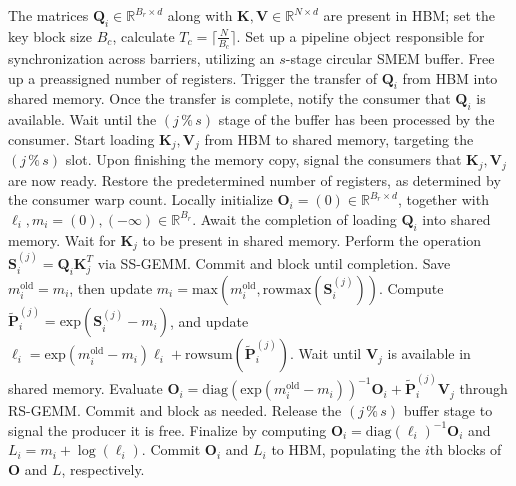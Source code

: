 \begin{algorithm}[H]
    \caption{\small\label{alg:flash3_wgmma_ws_only}\textsc{FlashAttention-3} forward pass \textbf{excluding} intra-consumer overlapping -- CTA perspective}
    \begin{algorithmic}[1]
\REQUIRE The matrices $\mathbf{Q}_i \in \mathbb{R}^{B_r \times d}$ along with $\mathbf{K}, \mathbf{V} \in \mathbb{R}^{N \times d}$ are present in HBM; set the key block size $B_c$, calculate $T_c = \lceil \frac{N}{B_c} \rceil$.
\STATE Set up a pipeline object responsible for synchronization across barriers, utilizing an $s$-stage circular SMEM buffer.
\STATE Free up a preassigned number of registers.
\STATE Trigger the transfer of $\mathbf{Q}_i$ from HBM into shared memory.
\STATE Once the transfer is complete, notify the consumer that $\mathbf{Q}_i$ is available.
    \STATE Wait until the $(j\,\%\,s)$ stage of the buffer has been processed by the consumer.
    \STATE Start loading $\mathbf{K}_j, \mathbf{V}_j$ from HBM to shared memory, targeting the $(j\,\%\,s)$ slot.
    \STATE Upon finishing the memory copy, signal the consumers that $\mathbf{K}_j, \mathbf{V}_j$ are now ready.
\ENDFOR
\ELSE \STATE Restore the predetermined number of registers, as determined by the consumer warp count.
\STATE Locally initialize $\mathbf{O}_i = (0) \in \mathbb{R}^{B_r \times d}$, together with $\ell_i, m_i = (0), (-\infty) \in \mathbb{R}^{B_r}$.
\STATE Await the completion of loading $\mathbf{Q}_i$ into shared memory.
\STATE Wait for $\mathbf{K}_j$ to be present in shared memory.
\STATE Perform the operation $\mathbf{S}_i^{(j)} = \mathbf{Q}_i \mathbf{K}_j^T$ via SS-GEMM. Commit and block until completion. \label{alg:ws_only_gemm1}
\STATE Save $m_i^{\mathrm{old}} = m_i$, then update $m_i = \mathrm{max}(m_i^{\mathrm{old}}, \mathrm{rowmax}(\mathbf{S}_i^{(j)}))$. \label{code-ws:softmax_start}
\STATE Compute $\widetilde{\mathbf{P}}_i^{(j)} = \mathrm{exp}(\mathbf{S}_i^{(j)} - m_i)$, and update $\ell_i = \mathrm{exp}(m_i^{\mathrm{old}} - m_i) \ell_i + \mathrm{rowsum}(\widetilde{\mathbf{P}}_i^{(j)})$. \label{code-ws:softmax_end}
\STATE Wait until $\mathbf{V}_j$ is available in shared memory.
\STATE Evaluate $\mathbf{O}_i = \mathrm{diag}(\mathrm{exp}(m_i^{\mathrm{old}} - m_i))^{-1} \mathbf{O}_i + \widetilde{\mathbf{P}}_i^{(j)} \mathbf{V}_j$ through RS-GEMM. Commit and block as needed. \label{alg:ws_only_gemm2}
\STATE Release the $(j\,\%\,s)$ buffer stage to signal the producer it is free.
\ENDFOR
\STATE Finalize by computing $\mathbf{O}_i = \mathrm{diag}(\ell_i)^{-1} \mathbf{O}_i$ and $L_i = m_i + \log(\ell_i)$.
\STATE Commit $\mathbf{O}_i$ and $L_i$ to HBM, populating the $i$th blocks of $\mathbf{O}$ and $L$, respectively.
\ENDIF
\end{algorithmic}
\end{algorithm}

